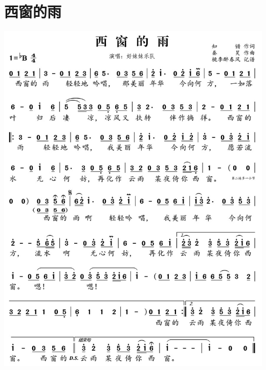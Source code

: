 \documentclass[cn,pad,chinesefont=nofont]{elegantbook}
\begin{document}
\section{西窗的雨}
    \includegraphics[width=\textwidth]{dongxiao/20200516-好妹妹-西窗的雨.jpg}
\end{document}
